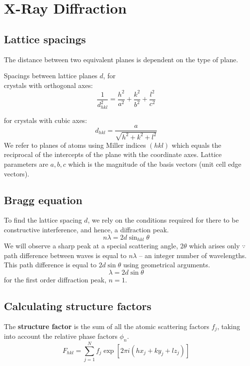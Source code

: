
\section{X-Ray Diffraction}
\subsection*{Lattice spacings}
The distance between two equivalent planes is dependent on the type of plane.
\vspace{\baselineskip}

Spacings between lattice planes $d$, for \\ crystals with orthogonal axes:
\begin{equation*}
  \frac{1}{d^2_{hkl}} = \frac{h^2}{a^2} + \frac{k^2}{b^2} + \frac{l^2}{c^2}
\end{equation*}

for crystals with cubic axes:
\begin{equation*}
  d_{hkl} = \frac{a}{\sqrt{h^2 + k^2 + l^2}}
\end{equation*}
We refer to planes of atoms using Miller indices $(hkl)$ which equals the reciprocal of the intercepts of the plane with the coordinate axes. Lattice parameters
are $a, b, c$ which is the magnitude of the basis vectors (unit cell edge vectors).

\subsection*{Bragg equation}
To find the lattice spacing $d$, we rely on the conditions required for there to be constructive interference, and hence, a diffraction peak.
\begin{equation*}
  n \lambda = 2d \sin_{hkl} \theta
\end{equation*}
We will observe a sharp peak at a special scattering angle, $2 \theta$ which arises only $\because$ path difference between waves is equal to $n \lambda$ -- an
integer number of wavelengths. This path difference is equal to $2d \sin \theta$ using geometrical arguments.
\begin{equation*}
  \lambda = 2d \sin \theta
\end{equation*}
for the first order diffraction peak, $n=1$.

\subsection*{Calculating structure factors}
The \textbf{structure factor} is the sum of all the atomic scattering factors $f_j$, taking into account the relative phase factors $\phi_n$.
\begin{equation*}
  F_{hkl} = \sum_{j=1}^N f_j \exp \left[2 \pi i \left( hx_j + ky_j + lz_j\right)\right]
\end{equation*}

